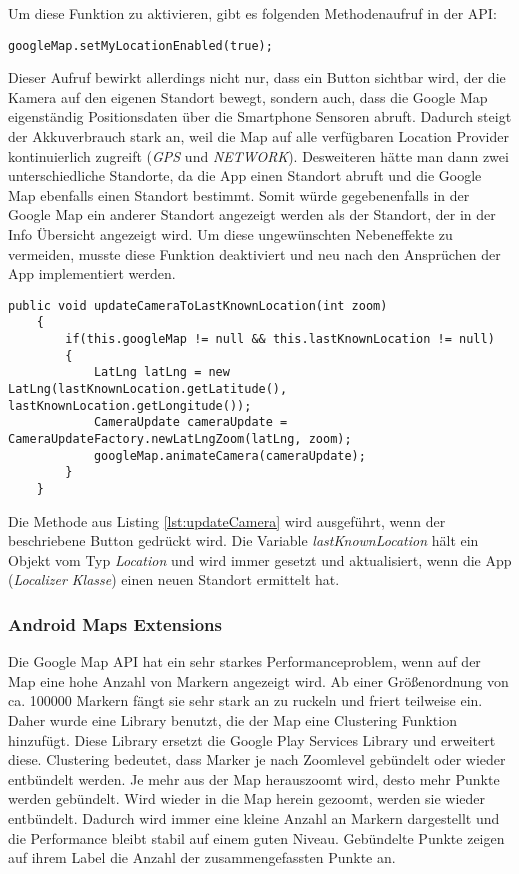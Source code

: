 Um diese Funktion zu aktivieren, gibt es folgenden Methodenaufruf in der API: 

\begin{lstlisting}[caption={},label=lst:setMyLocationEnabled]
	googleMap.setMyLocationEnabled(true);
\end{lstlisting}

Dieser Aufruf bewirkt allerdings nicht nur, dass ein Button sichtbar wird, der die Kamera auf den eigenen Standort bewegt, sondern auch, dass die Google Map eigenständig Positionsdaten über die Smartphone Sensoren abruft. Dadurch steigt der Akkuverbrauch stark an, weil die Map auf alle verfügbaren Location Provider kontinuierlich zugreift (\textit{GPS} und \textit{NETWORK}). Desweiteren hätte man dann zwei unterschiedliche Standorte, da die App einen Standort abruft und die Google Map ebenfalls einen Standort bestimmt. Somit würde gegebenenfalls in der Google Map ein anderer Standort angezeigt werden als der Standort, der in der Info Übersicht angezeigt wird. Um diese ungewünschten Nebeneffekte zu vermeiden, musste diese Funktion deaktiviert und neu nach den Ansprüchen der App implementiert werden.

\begin{lstlisting}[caption={Kamera auf letzte bekannte Position setzen},label=lst:updateCamera]
	public void updateCameraToLastKnownLocation(int zoom)
	{
		if(this.googleMap != null && this.lastKnownLocation != null)
		{
			LatLng latLng = new LatLng(lastKnownLocation.getLatitude(), 					lastKnownLocation.getLongitude());
		    CameraUpdate cameraUpdate = CameraUpdateFactory.newLatLngZoom(latLng, zoom);
		    googleMap.animateCamera(cameraUpdate);
		}
	}
\end{lstlisting}

Die Methode aus Listing \ref{lst:updateCamera} wird ausgeführt, wenn der beschriebene Button gedrückt wird. Die Variable \textit{lastKnownLocation} hält ein Objekt vom Typ \textit{Location} und wird immer gesetzt und aktualisiert, wenn die App (\textit{Localizer Klasse}) einen neuen Standort ermittelt hat. 

\subsubsection{Android Maps Extensions}

Die Google Map API hat ein sehr starkes Performanceproblem, wenn auf der Map eine hohe Anzahl von Markern angezeigt wird. Ab einer Größenordnung von ca. 100000 Markern fängt sie sehr stark an zu ruckeln und friert teilweise ein. Daher wurde eine Library benutzt, die der Map eine Clustering Funktion hinzufügt. Diese Library ersetzt die Google Play Services Library und erweitert diese. Clustering bedeutet, dass Marker je nach Zoomlevel gebündelt oder wieder entbündelt werden. Je mehr aus der Map herauszoomt wird, desto mehr Punkte werden gebündelt. Wird wieder in die Map herein gezoomt, werden sie wieder entbündelt. Dadurch wird immer eine kleine Anzahl an Markern dargestellt und die Performance bleibt stabil auf einem guten Niveau. Gebündelte Punkte zeigen auf ihrem Label die Anzahl der zusammengefassten Punkte an.

